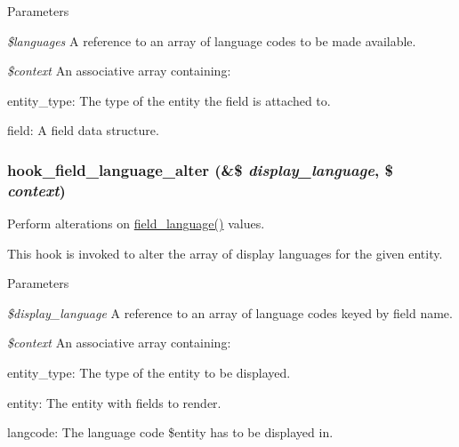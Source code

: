 \begin{DoxyParams}{Parameters}
\item[{\em \$languages}]A reference to an array of language codes to be made available. \item[{\em \$context}]An associative array containing:
\begin{DoxyItemize}
\item entity\_\-type: The type of the entity the field is attached to.
\item field: A field data structure. 
\end{DoxyItemize}\end{DoxyParams}
\hypertarget{group__field__attach_ga6411d5b5a528850a6e53c87ff899cabc}{
\subsubsection[{hook\_\-field\_\-language\_\-alter}]{\setlength{\rightskip}{0pt plus 5cm}hook\_\-field\_\-language\_\-alter (\&\$ {\em display\_\-language}, \/  \$ {\em context})}}
\label{group__field__attach_ga6411d5b5a528850a6e53c87ff899cabc}
Perform alterations on \hyperlink{group__field__language_gaff79088cd3951d2127adad1a2c13ad3e}{field\_\-language()} values.

This hook is invoked to alter the array of display languages for the given entity.


\begin{DoxyParams}{Parameters}
\item[{\em \$display\_\-language}]A reference to an array of language codes keyed by field name. \item[{\em \$context}]An associative array containing:
\begin{DoxyItemize}
\item entity\_\-type: The type of the entity to be displayed.
\item entity: The entity with fields to render.
\item langcode: The language code \$entity has to be displayed in. 
\end{DoxyItemize}\end{DoxyParams}
